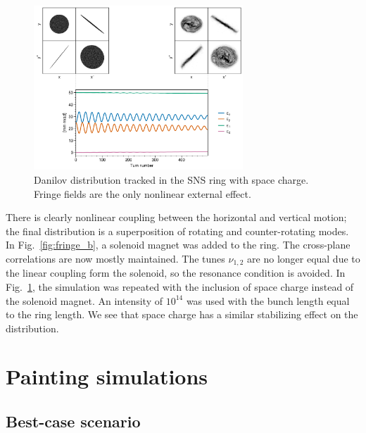 %
%
\begin{figure}[!p]
    \centering
    \includegraphics[width=0.7\textwidth]{Images/chapter3/fringe_spacecharge.png}
    \caption{Danilov distribution tracked in the SNS ring with space charge. Fringe fields are the only nonlinear external effect.}
    \label{fig:fringe_c}
    \vspace*{3cm}
\end{figure}
%

There is clearly nonlinear coupling between the horizontal and vertical motion; the final distribution is a superposition of rotating and counter-rotating modes. In Fig.~\ref{fig:fringe_b}, a solenoid magnet was added to the ring. The cross-plane correlations are now mostly maintained. The tunes $\nu_{1, 2}$ are no longer equal due to the linear coupling form the solenoid, so the resonance condition is avoided. In Fig.~\ref{fig:fringe_c}, the simulation was repeated with the inclusion of space charge instead of the solenoid magnet. An intensity of $10^{14}$ was used with the bunch length equal to the ring length. We see that space charge has a similar stabilizing effect on the distribution. 



\section{Painting simulations}


\subsection{Best-case scenario}

